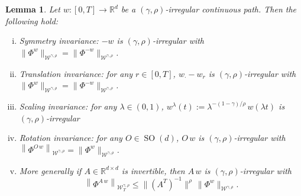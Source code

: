 \documentclass[10pt]{article}
\newcommand{\assign}{:=}
\newcommand{\comma}{{,}}
\newcommand{\tmop}[1]{\ensuremath{\operatorname{#1}}}
\newenvironment{enumerateroman}{\begin{enumerate}[i.] }{\end{enumerate}}
\newtheorem{lemma}[theorem]{Lemma}
\begin{document}
\begin{lemma}
  \label{sec2.2 lemma properties rho irr}Let $w : [0, T] \rightarrow
  \mathbb{R}^d$ be a $(\gamma, \rho)$\mbox{-}irregular continuous path. Then
  the following hold:
  \begin{enumerateroman}
    \item Symmetry invariance: $- w$ is $(\gamma, \rho)$\mbox{-}irregular with
    $\| \Phi^w \|_{\mathcal{W}^{\gamma, \rho}} = \| \Phi^{- w}
    \|_{\mathcal{W}^{\gamma, \rho}}$.
    
    \item Translation invariance: for any $r \in [0, T]$, $w_{\cdot} - w_r$ is
    $(\gamma, \rho)$\mbox{-}irregular with $\| \Phi^w \|_{\mathcal{W}^{\gamma,
    \rho}} = \| \Phi^{- w} \|_{\mathcal{W}^{\gamma, \rho}}$.
    
    \item Scaling invariance: for any $\lambda \in (0, 1)$, $w^{\lambda} (t)
    \assign \lambda^{- (1 - \gamma) / \rho} \, w (\lambda t)$ is $(\gamma,
    \rho)$\mbox{-}irregular
    
    \item Rotation invariance: for any $O \in \tmop{SO} (d)$, $O \, w$ is
    $(\gamma, \rho)$-irregular with $\left\| \Phi^{O \, w}
    \right\|_{\mathcal{W}^{\gamma \comma \rho}} = \| \Phi^w
    \|_{\mathcal{W}^{\gamma \comma \rho}}$.
    
    \item More generally if $A \in \mathbb{R}^{d \times d}$ is invertible,
    then $A \, w$ is $(\gamma, \rho)$-irregular with
    \[ \left\| \Phi^{A \, w} \right\|_{\mathcal{W}^{\gamma \comma \rho}_T}
       \leqslant \| (A^T)^{- 1} \|^{\rho} \, \| \Phi^w \|_{\mathcal{W}^{\gamma
       \comma \rho}} . \]
  \end{enumerateroman}
\end{lemma}
\end{document}
